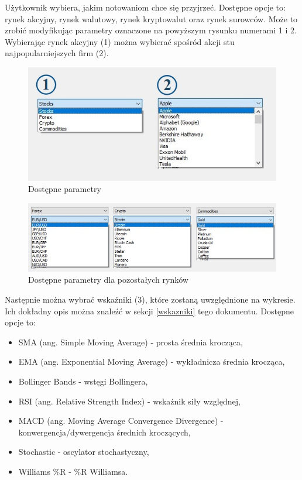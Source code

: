\documentclass[12pt]{article}
\begin{document}
	Użytkownik wybiera, jakim notowaniom chce się przyjrzeć. Dostępne opcje to: rynek akcyjny, rynek walutowy, rynek kryptowalut oraz rynek surowców. Może to zrobić modyfikując parametry oznaczone na powyższym rysunku numerami 1 i 2. Wybierając rynek akcyjny (1) można wybierać spośród akcji stu najpopularniejszych firm (2). 
	
	\begin{figure}[H]
		\centering
		\includegraphics[scale=0.7]{pics/opcje_12.jpg}
		\caption{Dostępne parametry} 
	\end{figure}
	
	\begin{figure}[H]
		\centering
		\includegraphics[scale=0.7]{pics/forex_crypto_commodities.jpg}
		\caption{Dostępne parametry dla pozostałych rynków}
	\end{figure}
	
	Następnie można wybrać wskaźniki (3), które zostaną uwzględnione na wykresie. Ich dokładny opis można znaleźć w sekcji \ref{wskazniki} tego dokumentu. Dostępne opcje to:
	
	\begin{itemize}
		\item SMA (ang. Simple Moving Average) - prosta średnia krocząca,
		\item EMA (ang. Exponential Moving Average) - wykładnicza średnia krocząca,
		\item Bollinger Bands - wstęgi Bollingera,  
		\item RSI (ang. Relative Strength Index) - wskaźnik siły względnej,
		\item MACD (ang. Moving Average Convergence Divergence) - konwergencja/dywergencja średnich kroczących,
		\item Stochastic - oscylator stochastyczny,
		\item Williams \%R - \%R Williamsa.
	\end{itemize}
	
\end{document}
